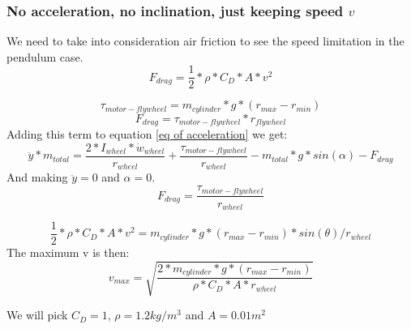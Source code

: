 \subsubsection{No acceleration, no inclination, just keeping speed $v$}
We need to take into consideration air friction to see the speed limitation in the pendulum case.
\[F_{drag} = \frac{1}{2}*\rho*C_D * A * v^2 \]



\[\tau_{motor-flywheel} = m_{cylinder} * g * (r_{max}-r_{min})\]
\[F_{drag} = \tau_{motor-flywheel} * r_{flywheel}\]
Adding this term to equation \ref{eq of acceleration} we get:
\[  \ddot{y}*m_{total} = \frac{2*I_{wheel} * \dot{w}_{wheel}}{r_{wheel}} + \frac{\tau_{motor-flywheel}}{r_{wheel}} - m_{total} * g * sin(\alpha) - F_{drag} \]
And making $\ddot{y} = 0$ and $\alpha = 0$.
\[  F_{drag} = \frac{\tau_{motor-flywheel}}{r_{wheel}}\]

\[\frac{1}{2}*\rho*C_D * A * v^2 = m_{cylinder} * g * (r_{max} - r_{min})*sin(\theta) / r_{wheel} \]
The maximum v is then:
\[v_{max} = \sqrt{\frac{2*m_{cylinder} * g * (r_{max} - r_{min})}{\rho*C_D * A * r_{wheel}} } \]

We will pick $C_D=1$, $\rho=1.2 kg/m^3$ and $A=0.01 m^2$
